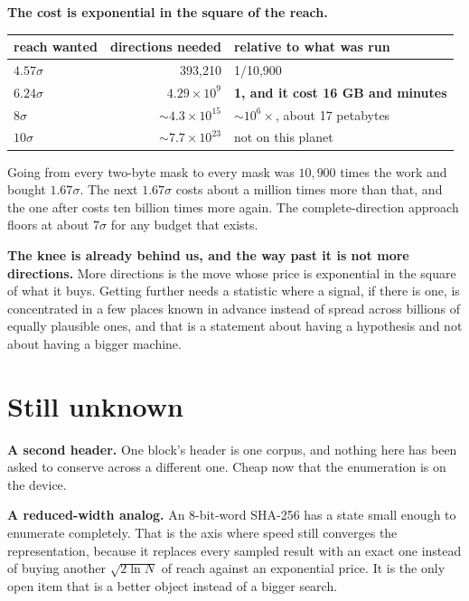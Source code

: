 \textbf{The cost is exponential in the square of the reach.}

\begin{center}
\begin{tabular}{@{}lrl@{}}
\toprule
reach wanted & directions needed & relative to what was run \\
\midrule
\(4.57\sigma\) & 393,210 & 1/10,900 \\
\textbf{\(6.24\sigma\)} & \(4.29\times10^{9}\) & \textbf{1, and it cost 16 GB and minutes} \\
\(8\sigma\) & \(\sim 4.3\times10^{15}\) & \(\sim 10^{6}\times\), about 17 petabytes \\
\(10\sigma\) & \(\sim 7.7\times10^{23}\) & not on this planet \\
\bottomrule
\end{tabular}
\end{center}

Going from every two-byte mask to every mask was \(10{,}900\) times the work and bought \(1.67\sigma\). The next \(1.67\sigma\) costs about a million times more than that, and the one after costs ten billion times more again. The complete-direction approach floors at about \(7\sigma\) for any budget that exists.

\textbf{The knee is already behind us, and the way past it is not more directions.} More directions is the move whose price is exponential in the square of what it buys. Getting further needs a statistic where a signal, if there is one, is concentrated in a few places known in advance instead of spread across billions of equally plausible ones, and that is a statement about having a hypothesis and not about having a bigger machine.

\section{Still unknown}

\textbf{A second header.} One block's header is one corpus, and nothing here has been asked to conserve across a different one. Cheap now that the enumeration is on the device.

\textbf{A reduced-width analog.} An 8-bit-word SHA-256 has a state small enough to enumerate completely. That is the axis where speed still converges the representation, because it replaces every sampled result with an exact one instead of buying another \(\sqrt{2\ln N}\) of reach against an exponential price. It is the only open item that is a better object instead of a bigger search.

